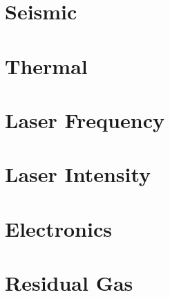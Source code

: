 \section{Seismic}

\section{Thermal}

\section{Laser Frequency}

\section{Laser Intensity}

\section{Electronics}

\section{Residual Gas}
